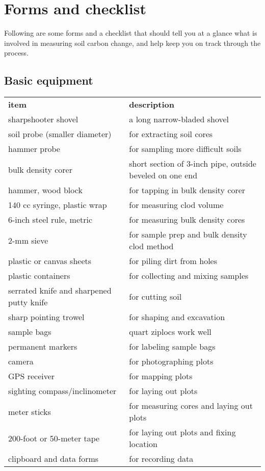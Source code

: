 \documentclass[11pt,letterpaper,oneside,onecolumn]{memoir}
\begin{document}
\chapter{Forms and checklist}

Following are some forms and a checklist that should tell you at a glance what is involved in measuring soil carbon change, and help keep you on track through the process.

\section{Basic equipment}
\small {}
\begin{tabular}{ll}
\textbf{item}&\textbf{description}\\
sharpshooter shovel&a long narrow-bladed shovel\\
soil probe (smaller diameter)&for extracting soil cores\\
hammer probe&for sampling more difficult soils\\
bulk density corer&short section of 3-inch pipe, outside beveled on one end\\
hammer, wood block&for tapping in bulk density corer\\
140 cc syringe, plastic wrap&for measuring clod volume\\
6-inch steel rule, metric&for measuring bulk density cores\\
2-mm sieve&for sample prep and bulk density clod method\\
plastic or canvas sheets&for piling dirt from holes\\
plastic containers&for collecting and mixing samples\\
serrated knife and sharpened putty knife&for cutting soil\\
sharp pointing trowel&for shaping and excavation\\
sample bags&quart ziplocs work well\\
permanent markers&for labeling sample bags\\
camera&for photographing plots\\
GPS receiver&for mapping plots\\
sighting compass/inclinometer&for laying out plots\\
meter sticks&for measuring cores and laying out plots\\
200-foot or 50-meter tape&for laying out plots and fixing location\\
clipboard and data forms&for recording data\\

\end{tabular}
\normalsize
\end{document}
